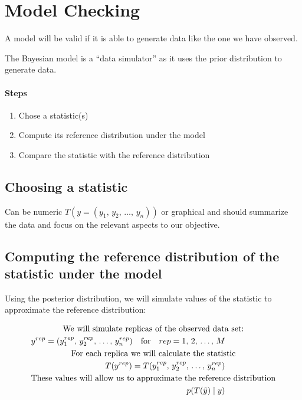 
\section{Model Checking}

A model will be valid if it is able to generate data like the one we have observed.

The Bayesian model is a ``data simulator'' as it uses the prior distribution to generate data.

\paragraph{Steps}
\begin{enumerate}
    \item Chose a statistic(s)
    \item Compute its reference distribution under the model
    \item Compare the statistic with the reference distribution
\end{enumerate}

\subsection{Choosing a statistic}

Can be numeric $T(y=(y_1,\, y_2,\, \dots,\, y_n))$ or graphical and should summarize the data and focus
on the relevant aspects to our objective.

\subsection{Computing the reference distribution of the statistic under the model}

Using the posterior distribution, we will simulate values of the statistic to approximate
the reference distribution:

\begin{align*}
    \span \text{We will simulate replicas of the observed data set:} \\
    y^{rep} = (y_1^{rep},\, y_2^{rep},\, \dots,\, y_n^{rep}) \quad \text{for} \quad rep = 1,\, 2,\, \dots,\, M \\
    \span \text{For each replica we will calculate the statistic} \\
    T(y^{rep}) = T(y_1^{rep},\, y_2^{rep},\, \dots,\, y_n^{rep}) \\
    \span \text{These values will allow us to approximate the reference distribution} \\
    p(T(\tilde y) \mid y)
\end{align*}

